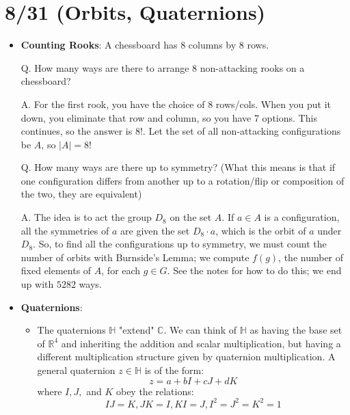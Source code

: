 \documentclass[11pt, oneside]{amsart}   	%
\theoremstyle{definition}
\begin{document}
\section{8/31 (Orbits, Quaternions)}

\begin{itemize}

	\item \textbf{Counting Rooks}: A chessboard has 8 columns by 8 rows.
	
	Q. How many ways are there to arrange 8 non-attacking rooks on a chessboard?
	
	A. For the first rook, you have the choice of 8 rows/cols. When you put it down, you eliminate that row and column, so you have 7 options. 
	This continues, so the answer is $8!$. Let the set of all non-attacking configurations be $A$, so $|A| = 8!$
	
	Q. How many ways are there up to symmetry? (What this means is that if one configuration differs from another up to a rotation/flip or 
	composition of the two, they are equivalent)
	
	A. The idea is to act the group $D_8$ on the set $A$. If $a\in A$ is a configuration, all the symmetries of $a$ are given the set $D_8\cdot a$, 
	which is the orbit of $a$ under $D_8$. So, to find all the configurations up to symmetry, we must count the number of orbits with Burnside's 
	Lemma; we compute $f(g)$, the number of fixed elements of $A$, for each $g\in G$. See the notes for how to do this; we end up with $5282 
	$ ways.
	
	\item \textbf{Quaternions}:
	
		\begin{itemize}
		
			\item The quaternions $\mathbb H$ "extend" $\mathbb C$. We can think of $\mathbb H$ as having the base set of $\mathbb 
			R^4$ and inheriting the addition and scalar multiplication, but having a different multiplication structure given by quaternion 
			multiplication. A general quaternion $z\in \mathbb H$ is of the form:
			$$
				z = a + bI + cJ + dK
			$$
			where $I, J,$ and $K$ obey the relations:
			$$
				IJ = K, JK = I, KI = J, I^2 = J^2 = K^2 = 1
			$$
			

\end{itemize}
\end{itemize}
\end{document}
